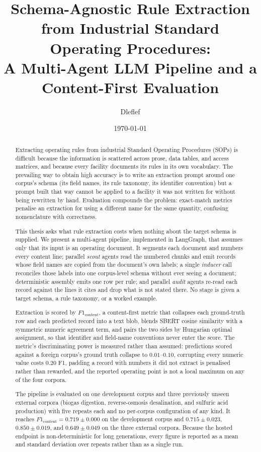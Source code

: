 \documentclass[11pt]{article}
\title{\textbf{Schema-Agnostic Rule Extraction from Industrial Standard
Operating Procedures:\\ A Multi-Agent LLM Pipeline and a Content-First
Evaluation}}
\author{Dleflef}
\date{\today}
\begin{document}
\maketitle

\begin{abstract}
Extracting operating rules from industrial Standard Operating Procedures (SOPs) is difficult because the information is scattered across prose, data tables, and access matrices, and because every facility documents its rules in its own vocabulary. The prevailing way to obtain high accuracy is to write an extraction prompt around one corpus's schema (its field names, its rule taxonomy, its identifier convention) but a prompt built that way cannot be applied to a facility it was not written for without being rewritten by hand. Evaluation compounds the problem: exact-match metrics penalise an extraction for using a different name for the same quantity, confusing nomenclature with correctness.

This thesis asks what rule extraction costs when nothing about the target schema is supplied. We present a multi-agent pipeline, implemented in LangGraph, that assumes only that its input is an operating document. It segments each document and numbers every content line; parallel \emph{scout} agents read the numbered chunks and emit records whose field names are copied from the document's own labels; a single \emph{inducer} call reconciles those labels into one corpus-level schema without ever seeing a document; deterministic assembly emits one row per rule; and parallel \emph{audit} agents re-read each record against the lines it cites and drop what is not stated there. No stage is given a target schema, a rule taxonomy, or a worked example.

Extraction is scored by $F1_{\text{content}}$, a content-first metric that collapses each ground-truth row and each predicted record into a text blob, blends SBERT cosine similarity with a symmetric numeric agreement term, and pairs the two sides by Hungarian optimal assignment, so that identifier and field-name conventions never enter the score. The metric's discriminating power is measured rather than assumed: predictions scored against a foreign corpus's ground truth collapse to $0.01$--$0.10$, corrupting every numeric value costs $0.20$ F1, padding a record with numbers it did not extract is penalised rather than rewarded, and the reported operating point is not a local maximum on any of the four corpora.

The pipeline is evaluated on one development corpus and three previously unseen external corpora (biogas digestion, reverse-osmosis desalination, and sulfuric acid production) with five repeats each and no per-corpus configuration of any kind. It reaches $F1_{\text{content}} = 0.719 \pm 0.000$ on the development corpus and $0.715 \pm 0.023$, $0.850 \pm 0.019$, and $0.649 \pm 0.049$ on the three external corpora. Because the hosted endpoint is non-deterministic for long generations, every figure is reported as a mean and standard deviation over repeats rather than as a single run.


\end{abstract}
\end{document}
